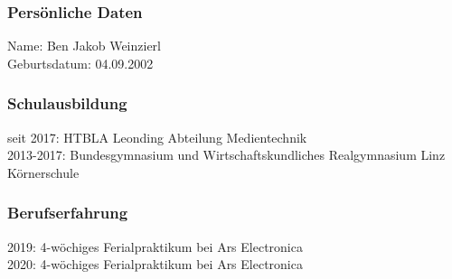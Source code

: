 \subsubsection{Persönliche Daten}
Name: Ben Jakob Weinzierl\\
Geburtsdatum: 04.09.2002
\subsubsection{Schulausbildung}
seit 2017: HTBLA Leonding Abteilung Medientechnik \\
2013-2017: Bundesgymnasium und Wirtschaftskundliches Realgymnasium Linz Körnerschule
\subsubsection{Berufserfahrung}
2019: 4-wöchiges Ferialpraktikum bei Ars Electronica\\
2020: 4-wöchiges Ferialpraktikum bei Ars Electronica

